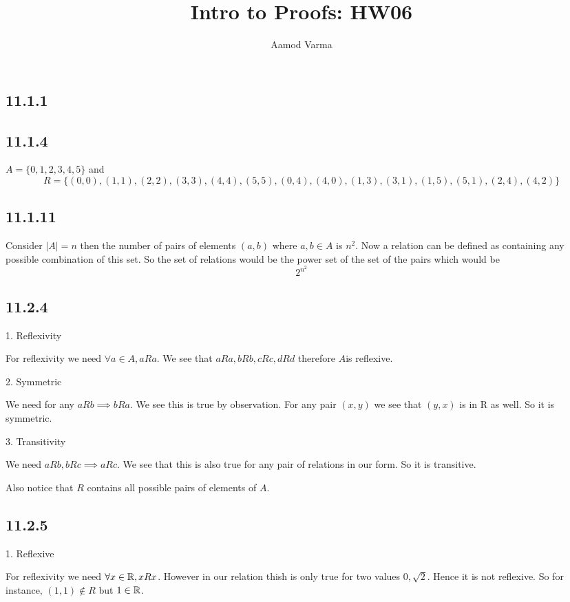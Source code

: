 \documentclass[a4paper]{report}
\title{Intro to Proofs: HW06}
\author{Aamod Varma}
\begin{document}
\maketitle
\date{}
    
\subsection*{11.1.1}
    


\subsection*{11.1.4}
$A = \{0,1,2,3,4,5\}$ and  $$R = \{(0,0),(1,1),(2,2),(3,3),(4,4),(5,5),(0,4),(4,0),(1,3),(3,1),(1,5),(5,1),(2,4),(4,2)\}$$

\subsection*{11.1.11}
Consider $|A| = n$ then the number of pairs of elements  $(a,b)$  where $a,b \in A$ is $n^2$. Now a relation can be defined as containing any possible combination of this set. So the set of relations would be the power set of the set of the pairs which would be $$2^{n^2}$$

\subsection*{11.2.4}
1. Reflexivity

For reflexivity we need $\forall a \in A, aRa$. We see that $aRa, bRb, cRc, dRd$ therefore $A$is reflexive.

2. Symmetric

We need for any  $aRb \implies bRa$. We see this is true by observation. For any pair  $(x,y)$ we see that $(y,x)$ is in R as well. So it is symmetric.


3. Transitivity

We need $aRb, bRc \implies aRc$. We see that this is also true for any pair of relations in our form. So it is transitive.

Also notice that $R$ contains all possible pairs of elements of $A$.

\subsection*{11.2.5}
1. Reflexive


For reflexivity we need $\forall x \in \mathbb{R}, xRx$. However in our relation thish is only true for two values $0,\sqrt{2}$. Hence it is not reflexive. So for instance, $(1,1) \not \in R$ but  $1 \in \mathbb{R}$.
\end{document}
